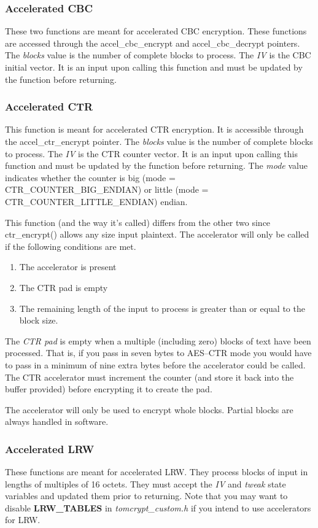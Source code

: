 \documentclass[synpaper]{book}
\begin{document}
\subsubsection{Accelerated CBC}
These two functions are meant for accelerated CBC encryption.  These functions are accessed through the accel\_cbc\_encrypt and accel\_cbc\_decrypt pointers.
The \textit{blocks} value is the number of complete blocks to process.  The \textit{IV} is the CBC initial vector.  It is an input upon calling this function and must be
updated by the function before returning.

\subsubsection{Accelerated CTR}
This function is meant for accelerated CTR encryption.  It is accessible through the accel\_ctr\_encrypt pointer.
The \textit{blocks} value is the number of complete blocks to process.  The \textit{IV} is the CTR counter vector.  It is an input upon calling this function and must be
updated by the function before returning.  The \textit{mode} value indicates whether the counter is big (mode = CTR\_COUNTER\_BIG\_ENDIAN) or
little (mode = CTR\_COUNTER\_LITTLE\_ENDIAN) endian.

This function (and the way it's called) differs from the other two since ctr\_encrypt() allows any size input plaintext.  The accelerator will only be
called if the following conditions are met.

\begin{enumerate}
   \item The accelerator is present
   \item The CTR pad is empty
   \item The remaining length of the input to process is greater than or equal to the block size.
\end{enumerate}

The \textit{CTR pad} is empty when a multiple (including zero) blocks of text have been processed.  That is, if you pass in seven bytes to AES--CTR mode you would have to
pass in a minimum of nine extra bytes before the accelerator could be called.  The CTR accelerator must increment the counter (and store it back into the
buffer provided) before encrypting it to create the pad.

The accelerator will only be used to encrypt whole blocks.  Partial blocks are always handled in software.

\subsubsection{Accelerated LRW}
These functions are meant for accelerated LRW.  They process blocks of input in lengths of multiples of 16 octets.  They must accept the \textit{IV} and \textit{tweak}
state variables and updated them prior to returning.  Note that you may want to disable \textbf{LRW\_TABLES} in \textit{tomcrypt\_custom.h} if you intend
to use accelerators for LRW.
\end{document}
